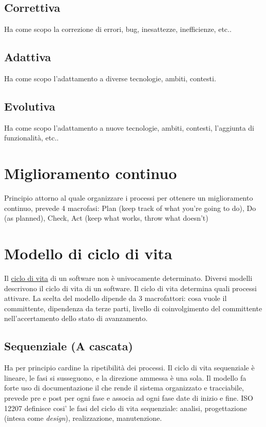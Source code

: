 		\subsection{Correttiva}
		Ha come scopo la correzione di errori, bug, inesattezze, inefficienze, etc..
		
		\subsection{Adattiva}
		Ha come scopo l'adattamento a diverse tecnologie, ambiti, contesti.
		
		\subsection{Evolutiva}
		Ha come scopo l'adattamento a nuove tecnologie, ambiti, contesti, l'aggiunta di funzionalità, etc..

	\section{Miglioramento continuo}
	\label{sec:miglioramentocontinuo}
	Principio attorno al quale organizzare i processi per ottenere un miglioramento continuo, prevede 4 macrofasi:
	Plan (keep track of what you're going to do), Do (as planned), Check, Act (keep what works, throw what doesn't)
		
	\section{Modello di ciclo di vita}
	\label{sec:modelliciclodivita}
	Il \hyperref[sec:ciclodivita]{ciclo di vita} di un software non è univocamente determinato. Diversi modelli descrivono il ciclo di vita di un software.
	Il ciclo di vita determina quali processi attivare. La scelta del modello dipende da 3 macrofattori: cosa vuole il committente, dipendenza da terze parti, livello di coinvolgimento del committente nell'accertamento dello stato di avanzamento.
	
		\subsection{Sequenziale (A cascata)}
			Ha per principio cardine la ripetibilità dei processi.
			Il ciclo di vita sequenziale è lineare, le fasi si susseguono, e la direzione
			ammessa è una sola.
			Il modello fa forte uso di documentazione il che rende il sistema organizzato e tracciabile, prevede pre e post per ogni fase e associa ad ogni fase date di inizio e fine.  
ISO 12207 definisce cosi' le fasi del ciclo di vita sequenziale: analisi, progettazione (intesa come \textit{design}), realizzazione, manutenzione. 		
		
